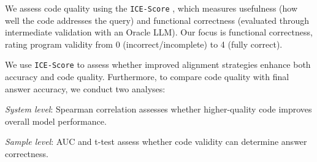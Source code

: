 % 
%
We assess code quality using the \texttt{ICE-Score} \cite{ice-score}, which measures usefulness (how well the code addresses the query) and functional correctness (evaluated through intermediate validation with an Oracle LLM). Our focus is functional correctness, rating program validity from 0 (incorrect/incomplete) to 4 (fully correct).

%
We use \texttt{ICE-Score} to assess whether improved alignment strategies enhance both accuracy and code quality. 
Furthermore, to compare code quality with final answer accuracy, we conduct two analyses:
\begin{inparaenum}[(i)]
    \item \emph{System level}: Spearman correlation assesses whether higher-quality code improves overall model performance.
    \item \emph{Sample level}: AUC and t-test assess whether code validity can determine answer correctness.
\end{inparaenum}


